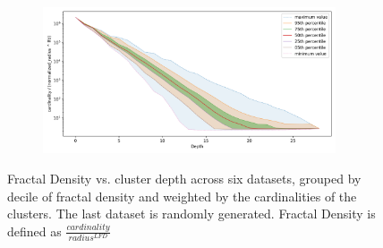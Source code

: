 \documentclass{article}
\begin{document}
\begin{figure}[ht!]
\begin{subfigure}[b]{0.47\textwidth}
    \label{fig:results:silva-fractal_density}
    \end{subfigure}%
    \begin{subfigure}[b]{0.47\textwidth}
    \includegraphics[width=0.95\textwidth]{images/fractal_density/random-1000000.png}\\
    \label{fig:results:random-fractal_density}
    \end{subfigure}
    \vspace{1em}
    \caption{Fractal Density vs. cluster depth across six datasets, grouped by decile of fractal density and weighted by the cardinalities of the clusters.
    The last dataset is randomly generated.
    Fractal Density is defined as $\frac{cardinality}{radius^{LFD}}$}
    \label{fig:results:fractal_density-plots}
\end{figure}
\end{document}
